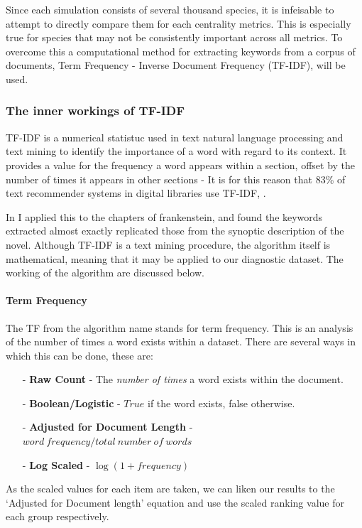 Since each simulation consists of several thousand species, it is infeisable to attempt to directly compare them for each centrality metrics. This is especially true for species that may not be consistently important across all metrics. To overcome this a computational method for extracting keywords from a corpus of documents, Term Frequency - Inverse Document Frequency (TF-IDF), will be used. 

\subsubsection{The inner workings of TF-IDF}
TF-IDF is a numerical statistuc used in text natural language processing and text mining to identify the importance of a word with regard to its context. It provides a value for the frequency a word appears within a section, offset by the number of times it appears in other sections - It is for this reason that 83\% of text recommender systems in digital libraries use TF-IDF, \citep{tf83}. 

 In \citep{frankenstein} I applied this to the chapters of frankenstein, and found the keywords extracted almost exactly replicated those from the synoptic description of the novel. Although TF-IDF is a text mining procedure, the algorithm itself is mathematical, meaning that it may be applied to our diagnostic dataset. The working of the algorithm are discussed below.

\paragraph*{Term Frequency}
The TF from the algorithm name stands for term frequency. This is an analysis of the number of times a word exists within a dataset. There are several ways in which this can be done, these are:

\begin{itemize}
    \item[-] \textbf{Raw Count} - The \textit{number of times} a word exists within the document.
    \item[-] \textbf{Boolean/Logistic} - $True$ if the word exists, false otherwise.
    \item[-] \textbf{Adjusted for Document Length} -  $word\ frequency / total\ number\ of\ words$
    \item[-] \textbf{Log Scaled} - $\log(1+frequency)$
\end{itemize}

As the scaled values for each item are taken, we can liken our results to the `Adjusted for Document length' equation and use the scaled ranking value for each group respectively.

